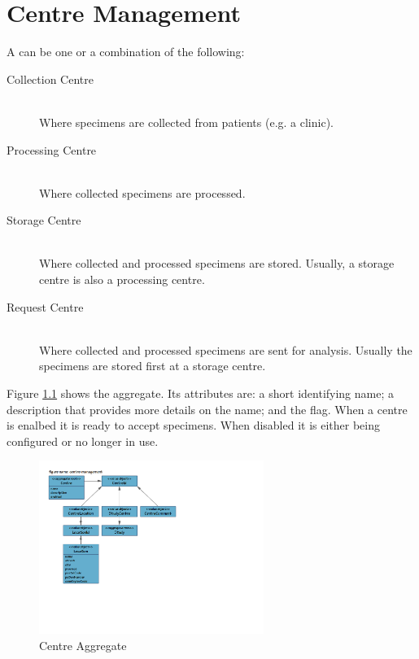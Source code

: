 \chapter{Centre Management}
\label{chap:centre-management}

A  can be one or a combination of the following:
\begin{description}

\item[Collection Centre] \hfill \\ Where specimens are collected from patients
  (e.g. a clinic).

\item[Processing Centre] \hfill \\ Where collected specimens are processed.

\item[Storage Centre] \hfill \\ Where collected and processed specimens are
  stored. Usually, a storage centre is also a processing centre.

\item[Request Centre] \hfill \\ Where collected and processed specimens are
  sent for analysis. Usually the specimens are stored first at a storage
  centre.
\end{description}

Figure \ref{fig:centre-aggregate} shows the  aggregate. Its
attributes are: a short identifying name; a description that provides more
details on the name; and the  flag. When a centre is enalbed
it is ready to accept specimens. When disabled it is either being configured or
no longer in use.

\begin{figure}[H]
  \centering
  \includegraphics[trim={10mm 62mm 108mm 18mm}, clip,
    width=0.65\textwidth]{images/centre-management}
  \caption{Centre Aggregate}
  \label{fig:centre-aggregate}
\end{figure}

